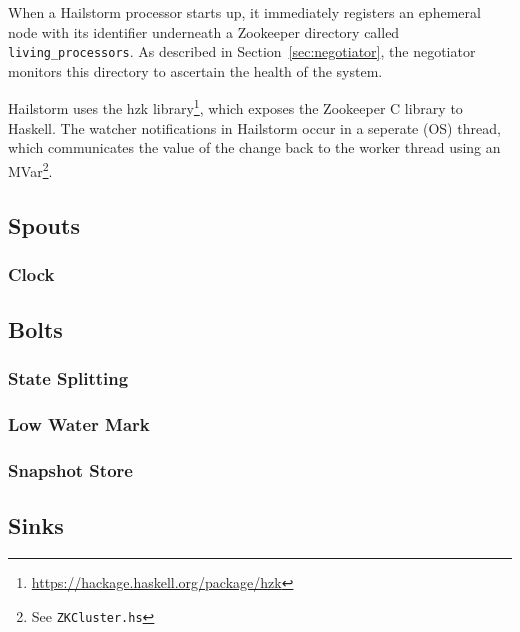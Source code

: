 \documentclass[10pt,nocopyrightspace]{sigplanconf}
\begin{document}
When a Hailstorm processor starts up, it immediately registers an ephemeral node
with its identifier underneath a Zookeeper directory called
\texttt{living\_processors}. As described in Section~\ref{sec:negotiator}, the
negotiator monitors this directory to ascertain the health of the system.

Hailstorm uses the hzk library\footnote{
\url{https://hackage.haskell.org/package/hzk}}, which exposes the
Zookeeper C library to Haskell. The watcher notifications in Hailstorm occur in
a seperate (OS) thread, which communicates the value of the change
back to the worker thread using an MVar\footnote{See \texttt{ZKCluster.hs}}.

\subsection{Spouts}

\subsubsection{Clock}
\label{sec:clock}

\subsection{Bolts}

\subsubsection{State Splitting}

\subsubsection{Low Water Mark}

\subsubsection{Snapshot Store}
\label{sec:snapshot}

\subsection{Sinks}
\end{document}
